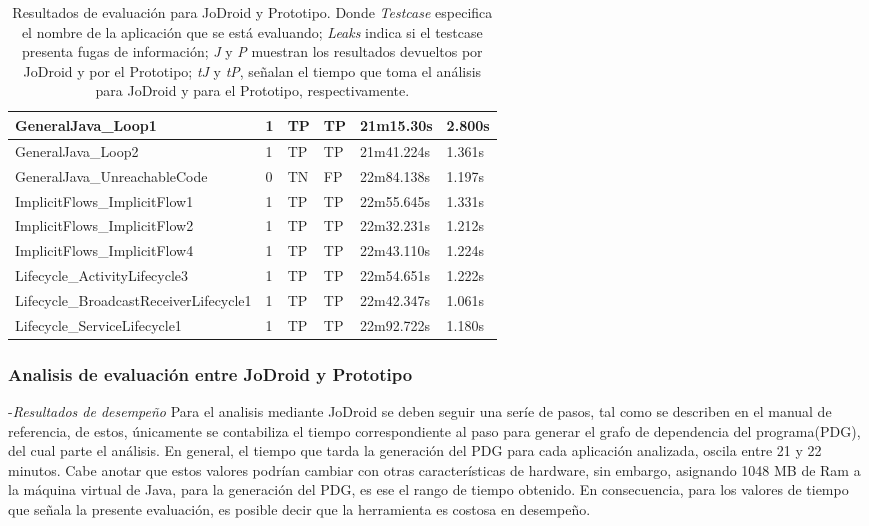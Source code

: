 \begin{table}[H]
\begin{center}
\begin{tabular}{|p{6cm}|p{1cm}|p{1cm}|p{1cm}|p{}|p{1cm}|}
	\hline
	GeneralJava\_Loop1 & 1 & TP & TP &21m15.30s&2.800s\\
	\hline
	GeneralJava\_Loop2 & 1 & TP & TP &21m41.224s&1.361s\\
	\hline
	GeneralJava\_UnreachableCode & 0 & TN & FP &22m84.138s&1.197s\\
	\hline
	ImplicitFlows\_ImplicitFlow1 & 1 & TP & TP &22m55.645s&1.331s\\
	\hline
	ImplicitFlows\_ImplicitFlow2 & 1 & TP & TP &22m32.231s&1.212s\\
	\hline
	ImplicitFlows\_ImplicitFlow4 & 1 & TP & TP &22m43.110s&1.224s\\
	\hline
	Lifecycle\_ActivityLifecycle3 & 1 & TP & TP &22m54.651s&1.222s\\
	\hline
	Lifecycle\_BroadcastReceiverLifecycle1 & 1 & TP & TP &22m42.347s&1.061s\\
	\hline
	Lifecycle\_ServiceLifecycle1 & 1 & TP & TP &22m92.722s&1.180s\\
	\hline
\end{tabular}
\end{center}
\caption{Resultados de evaluación para JoDroid y Prototipo. Donde
\textit{Testcase} especifica el nombre de la aplicación que se está evaluando;
\textit{Leaks} indica si el testcase presenta fugas de información; \textit{J} y
\textit{P} muestran los resultados devueltos por JoDroid y por el Prototipo;
\textit{tJ} y \textit{tP}, señalan el tiempo que toma el análisis para JoDroid
y para el Prototipo, respectivamente.}
\label{tab:JoDroid-Prototipo}
\end{table}

\subsubsection{Analisis de evaluación entre JoDroid y Prototipo}
-\textit{Resultados de desempeño}\newline
Para el analisis mediante JoDroid se deben seguir una seríe de pasos, tal como
se describen en el manual de referencia\cite{joDroidManual}, de estos,
únicamente se contabiliza el tiempo correspondiente al paso para generar el
grafo de dependencia del programa(PDG), del cual parte el análisis. En general,
el tiempo que tarda la generación del PDG para cada aplicación analizada, oscila
entre 21 y 22 minutos. Cabe anotar que estos valores podrían cambiar con otras
características de hardware, sin embargo, asignando 1048 MB de Ram a la máquina
virtual de Java, para la generación del PDG, es ese el rango de tiempo obtenido.
En consecuencia, para los valores de tiempo que señala la presente evaluación,
es posible decir que la herramienta es costosa en desempeño.


